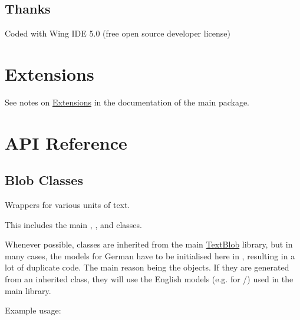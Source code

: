 \documentclass[letterpaper,10pt,english]{sphinxmanual}
\begin{document}
\subsection{Thanks}
\label{readme:thanks}
Coded with Wing IDE 5.0 (free open source developer license)
\href{https://wingware.com/store/free}{}

\section{Extensions}
\label{extensions:id1}\label{extensions:extensions}\label{extensions::doc}
See notes on \href{http://textblob.readthedocs.org/en/dev/extensions.html}{Extensions}
in the documentation of the main package.


\section{API Reference}
\label{api_reference:api-reference}\label{api_reference:api}\label{api_reference::doc}

\subsection{Blob Classes}
\label{api_reference:module-textblob_de.blob}\label{api_reference:blob-classes}
Wrappers for various units of text.

This includes the main {\hyperref[api_reference:textblob_de.blob.TextBlobDE]{}},
{\hyperref[api_reference:textblob_de.blob.Word]{}}, and {\hyperref[api_reference:textblob_de.blob.WordList]{}} classes.

Whenever possible, classes are inherited from the main \href{http://textblob.readthedocs.org/}{TextBlob} library, but in many
cases, the models for German have to be initialised here in {\hyperref[api_reference:module-textblob_de.blob]{}}, resulting 
in a lot of duplicate code. The main reason being the {\hyperref[api_reference:textblob_de.blob.Word]{}} objects. 
If they are generated from an inherited class, they will use the English models 
(e.g. for /) used in the main library.

Example usage:
\end{document}
